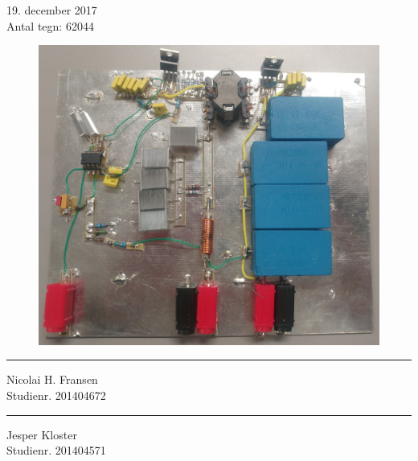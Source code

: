 \documentclass[11pt, a4paper, twoside, openany]{memoir}
\begin{document}
\begin{titlingpage}
\begin{center}
				19. december 2017 \\
				\vspace{10pt}
				Antal tegn: 62044
				\vspace{10pt}
				\begin{figure}[H]
					\centering
					\includegraphics[max width=0.9\linewidth]{converter.jpg}
				\end{figure}
				\vspace{50pt}
				\begin{minipage}{0.25\linewidth}
					\centering
					\hrule
					\vspace{12pt}
					Nicolai H. Fransen\\
					Studienr. 201404672
				\end{minipage}
				\hspace{10pt}
				\begin{minipage}{0.25\linewidth}
					\centering
					\hrule
					\vspace{12pt}
					Jesper Kloster\\
					Studienr. 201404571
				\end{minipage}
				\hspace{10pt}


		\end{center}

\end{titlingpage}
		
\end{document}
